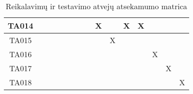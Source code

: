 \begin{table}[h]
\begin{tabular}{|c|c|c|c|c|c|c|c|c|c|c|c|c|c|c|}
    TA014 &     &     &     &     &     &     &     & X   &     & X   & X   &     &     &     \\ \hline
    TA015 &     &     &     &     &     &     &     &     & X   &     &     &     &     &     \\ \hline
    TA016 &     &     &     &     &     &     &     &     &     &     &     & X   &     &     \\ \hline
    TA017 &     &     &     &     &     &     &     &     &     &     &     &     & X   &     \\ \hline
    TA018 &     &     &     &     &     &     &     &     &     &     &     &     &     & X   \\ \hline
  \end{tabular}
  \caption{Reikalavimų ir testavimo atvejų atsekamumo matrica}
  \label{table:matrica}
\end{table}